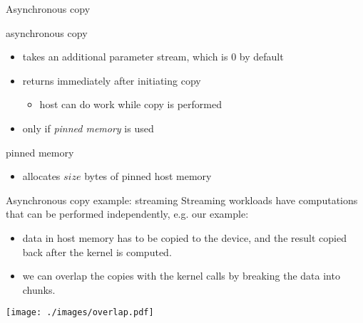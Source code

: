 \begin{frame}[fragile]{Asynchronous copy}

    \begin{info}{asynchronous copy}
        \centering {}
        \begin{itemize}
            \item takes an additional parameter stream, which is 0 by default
            \item returns immediately after initiating copy
            \begin{itemize}
                \item host can do work while copy is performed
            \end{itemize}
            \item only if \emph{pinned memory} is used
        \end{itemize}
    \end{info}

    \begin{info}{pinned memory}
        \centering {}
        \begin{itemize}
            \item allocates $size$ bytes of pinned host memory
        \end{itemize}
    \end{info}

\end{frame}

\begin{frame}[fragile]{Asynchronous copy example: streaming}
    Streaming workloads have computations that can be performed independently, e.g. our \axpy example:
    \begin{itemize}
        \item data in host memory has to be copied to the device, and the result copied back after the kernel is computed.
        \item we can overlap the copies with the kernel calls by breaking the data into chunks.
    \end{itemize}
    \texttt{[image: ./images/overlap.pdf]}
\end{frame}

